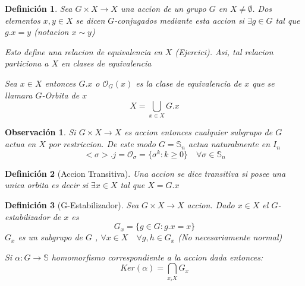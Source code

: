 \documentclass[10pt]{extarticle}
\theoremstyle{break}
\newtheorem*{remark}{Observación}
\newtheorem{definition}{Definición}[section]
\theoremstyle{definition}
\begin{document}
\begin{definition}
	Sea $G\times X \longrightarrow X$ una accion de un grupo $G$ en $X\neq\emptyset$. Dos elementos $x,y\in X $ se dicen $G$-conjugados mediante esta accion si $\exists g\in G $ tal que $g.x=y$ (notacion $x\sim y$)

	Esto define una relacion de equivalencia en $X$ (Ejercici). Asi, tal relacion particiona a $X$ en clases de equivalencia

	Sea $x\in X $ entonces $G.x$ o $\mathcal{O}_{G}(x)$ es la clase de equivalencia de $x$ que se llamara $G$-Orbita de $x$ $$X=\bigcup_{x\in X }G.x $$
\end{definition}

\begin{remark}
	Si $G\times X \longrightarrow X$ es accion entonces cualquier subgrupo de $G$ actua en $X$ por restriccion. De este modo $G=\mathbb{S}_{n}$ actua naturalmente en $I_{n}$ 
	$$<\sigma>.j=\mathcal{O}_{\sigma}=\{\sigma^{k}:k\geq 0\}\quad \forall\sigma \in\mathbb{S}_{n} $$ 
\end{remark}

\begin{definition}[Accion Transitiva]
	Una accion se dice transitiva si posee una unica orbita es decir si $\exists x\in X $ tal que $X=G.x$
\end{definition}

\begin{definition}[G-Estabilizador]
	Sea $G\times X\longrightarrow X$ accion. Dado $x\in X$ el $G$-estabilizador de $x$ es $$G_{x}=\{g\in G: g.x=x\}$$
	$G_{x}$ es un subgrupo de $G$ , $\forall x\in X\quad\forall g,h\in G_{x}$ (No necesariamente normal)

	Si $\alpha :G\longrightarrow \mathbb{S}$ homomorfismo correspondiente a la accion dada entonces: $$Ker(\alpha)=\bigcap_{x_{i} X}G_{x}$$
\end{definition}
\end{document}
